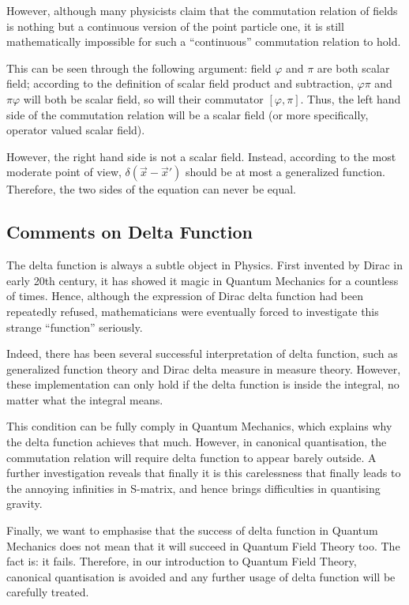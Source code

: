 \documentclass[letterpaper,10pt,english]{sphinxmanual}
\begin{document}
However, although many physicists claim that the commutation relation of fields is nothing but a continuous version of the point particle one, it is still mathematically impossible for such a “continuous” commutation relation to hold.

This can be seen through the following argument: field \(\varphi\) and \(\pi\) are both scalar field; according to the definition of scalar field product and subtraction, \(\varphi\pi\) and \(\pi\varphi\) will both be scalar field, so will their commutator \([\varphi, \pi]\). Thus, the left hand side of the commutation relation will be a scalar field (or more specifically, operator valued scalar field).

However, the right hand side is not a scalar field. Instead, according to the most moderate point of view, \(\delta(\vec x - \vec x')\) should be at most a generalized function. Therefore, the two sides of the equation can never be equal.


\subsection{Comments on Delta Function}
\label{\detokenize{intro_why:comments-on-delta-function}}
The delta function is always a subtle object in Physics. First invented by Dirac in early 20th century, it has showed it magic in Quantum Mechanics for a countless of times. Hence, although the expression of Dirac delta function had been repeatedly refused, mathematicians were eventually forced to investigate this strange “function” seriously.

Indeed, there has been several successful interpretation of delta function, such as generalized function theory and Dirac delta measure in measure theory. However, these implementation can only hold if the delta function is inside the integral, no matter what the integral means.

This condition can be fully comply in Quantum Mechanics, which explains why the delta function achieves that much. However, in canonical quantisation, the commutation relation will require delta function to appear barely outside. A further investigation reveals that finally it is this carelessness that finally leads to the annoying infinities in S-matrix, and hence brings difficulties in quantising gravity.

Finally, we want to emphasise that the success of delta function in Quantum Mechanics does not mean that it will succeed in Quantum Field Theory too. The fact is: it fails. Therefore, in our introduction to Quantum Field Theory, canonical quantisation is avoided and any further usage of delta function will be carefully treated.
\end{document}
